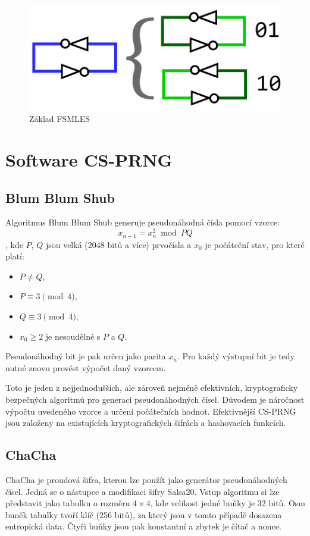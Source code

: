 \documentclass[a4paper,12pt]{article}
\begin{document}
	\begin{figure}[ht]
		\centering
		\includegraphics[width=.55\textwidth]{src/img2}
		\caption{Základ FSMLES}
		\label{_tag_img_fsmles}
	\end{figure}
		
	\section{Software CS-PRNG}

	\subsection{Blum Blum Shub}
	
	Algoritmus Blum Blum Shub generuje pseudonáhodná čísla pomocí vzorce: $$x_{n+1}=x_n^2 \bmod PQ$$, kde $P$, $Q$ jsou velká (2048 bitů a více) prvočísla a $x_0$ je počáteční stav, pro které platí:
	\begin{itemize}
		\item $P \neq Q$,
		\item $P \equiv 3 \pmod 4$,
		\item $Q \equiv 3 \pmod 4$,
		\item $x_0 \ge 2$ je nesoudělné s $P$ a $Q$.
	\end{itemize}
	Pseudonáhodný bit je pak určen jako parita $x_n$. Pro každý výstupní bit je tedy nutné znovu provést výpočet daný vzorcem.
	
	Toto je jeden z nejjednodušších, ale zároveň nejméně efektivních, kryptograficky bezpečných algoritmů pro generaci pseudonáhodných čísel. Důvodem je náročnost výpočtu uvedeného vzorce a určení počátečních hodnot. Efektivnější CS-PRNG jsou založeny na existujících kryptografických šifrách a hashovacích funkcích.

	\subsection{ChaCha}
	
	ChaCha je proudová šifra, kterou lze použít jako generátor pseudonáhodných čísel. Jedná se o nástupce a modifikaci šifry Salsa20. Vstup algoritmu si lze představit jako tabulku o rozměru $4\times4$, kde velikost jedné buňky je 32 bitů. Osm buněk tabulky tvoří klíč (256 bitů), za který jsou v tomto případě dosazena entropická data. Čtyři buňky jsou pak konstantní a zbytek je čítač a nonce.
	
\end{document}
